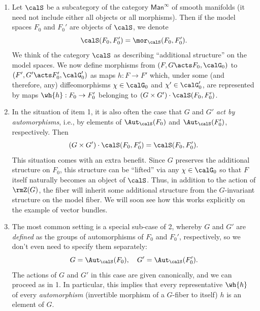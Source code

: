 \begin{enumerate}
    \item Let $\calS$ be a subcategory of the category $\mathsf{Man}^\infty$ of smooth manifolds (it need not include either all objects or all morphisms). Then if the model spaces $F_0$ and $F_0'$ are objects of $\calS$, we denote
    \[\calS(F_0,F_0')=\mor_\calS(F_0,F_0').\]
    We think of the category $\calS$ as describing ``additional structure'' on the model spaces. We now define morphisms from $(F,G\acts F_0,\calG_0)$ to $(F',G'\acts F_0',\calG_0')$ as maps $h:F\to F'$ which, under some (and therefore, any) diffeomorphisms $\chi\in\calG_0$ and $\chi'\in\calG_0'$, are represented by maps $\wh{h}:F_0\to F_0'$ belonging to $(G\times G')\cdot \calS(F_0,F_0')$.
    
    \item In the situation of item 1, it is also often the case that $G$ and $G'$ \emph{act by automorphisms}, i.e., by elements of $\Aut_\calS(F_0)$ and $\Aut_\calS(F_0')$, respectively. Then 
    \[(G\times G')\cdot \calS(F_0,F_0')=\calS(F_0,F_0').\]
    This situation comes with an extra benefit. Since $G$ preserves the additional structure on $F_0$, this structure can be ``lifted'' via any $\chi\in \calG_0$ so that $F$ itself naturally becomes an object of $\calS$. Thus, in addition to the action of $\rmZ(G)$, the fiber will inherit some additional structure from the $G$-invariant structure on the model fiber. We will soon see how this works explicitly on the example of vector bundles.
    \item The most common setting is a special sub-case of 2, whereby $G$ and $G'$ are \emph{defined} as the groups of automorphisms of $F_0$ and $F_0'$, respectively, so we don't even need to specify them separately:
    \[G=\Aut_\calS(F_0),\quad G'=\Aut_\calS(F_0').\]
    The actions of $G$ and $G'$ in this case are given canonically, and we can proceed as in 1. In particular, this implies that every representative $\wh{h}$ of every \emph{automorphism} (invertible morphism of a $G$-fiber to itself) $h$ is an element of $G$.
\end{enumerate}

